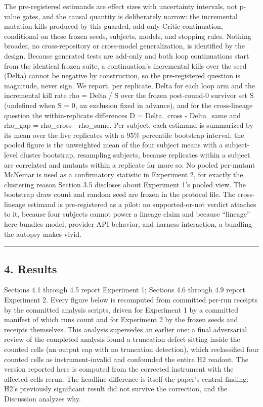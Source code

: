 \documentclass[
  11pt,
]{article}
\begin{document}
The pre-registered estimands are effect sizes with uncertainty
intervals, not p-value gates, and the causal quantity is deliberately
narrow: the incremental mutation kills produced by this guarded,
add-only Critic continuation, conditional on these frozen seeds,
subjects, models, and stopping rules. Nothing broader, no
cross-repository or cross-model generalization, is identified by the
design. Because generated tests are add-only and both loop continuations
start from the identical frozen suite, a continuation's incremental
kills over the seed (Delta) cannot be negative by construction, so the
pre-registered question is magnitude, never sign. We report, per
replicate, Delta for each loop arm and the incremental kill rate rho =
Delta / \textbar S\textbar{} over the frozen post-round-0 survivor set S
(undefined when \textbar S\textbar{} = 0, an exclusion fixed in
advance), and for the cross-lineage question the within-replicate
differences D = Delta\_cross - Delta\_same and rho\_gap = rho\_cross -
rho\_same. Per subject, each estimand is summarized by its mean over the
five replicates with a 95\% percentile bootstrap interval; the pooled
figure is the unweighted mean of the four subject means with a
subject-level cluster bootstrap, resampling subjects, because replicates
within a subject are correlated and mutants within a replicate far more
so. No pooled per-mutant McNemar is used as a confirmatory statistic in
Experiment 2, for exactly the clustering reason Section 3.5 discloses
about Experiment 1's pooled view. The bootstrap draw count and random
seed are frozen in the protocol file. The cross-lineage estimand is
pre-registered as a pilot: no supported-or-not verdict attaches to it,
because four subjects cannot power a lineage claim and because
``lineage'' here bundles model, provider API behavior, and harness
interaction, a bundling the autopsy makes vivid.

\begin{center}\rule{0.5\linewidth}{0.5pt}\end{center}

\subsection{4. Results}\label{results}

Sections 4.1 through 4.5 report Experiment 1; Sections 4.6 through 4.9
report Experiment 2. Every figure below is recomputed from committed
per-run receipts by the committed analysis scripts, driven for
Experiment 1 by a committed manifest of which runs count and for
Experiment 2 by the frozen seeds and receipts themselves. This analysis
supersedes an earlier one: a final adversarial review of the completed
analysis found a truncation defect sitting inside the counted cells (an
output cap with no truncation detection), which reclassified four
counted cells as instrument-invalid and confounded the entire H2
readout. The version reported here is computed from the corrected
instrument with the affected cells rerun. The headline difference is
itself the paper's central finding: H2's previously significant result
did not survive the correction, and the Discussion analyzes why.
\end{document}
